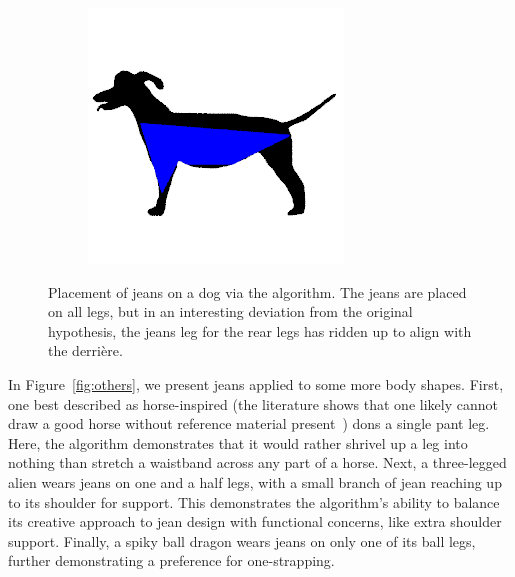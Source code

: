 \documentclass[twocolumn]{article}
\begin{document}
\begin{figure}
\begin{subfigure}{0.23\textwidth}
        \includegraphics[width=0.92\linewidth]{img/dog/iter_99.png}
    \end{subfigure}
    \caption{Placement of jeans on a dog via the algorithm. The jeans are placed on all legs, but in an interesting deviation from the original hypothesis, the jeans leg for the rear legs has ridden up to align with the derri\`ere.}
    \label{fig:dog}
\end{figure}

In Figure~\ref{fig:others}, we present jeans applied to some more body shapes. First, one best described as horse-inspired (the literature shows that one likely cannot draw a good horse without reference material present~\cite{pagurek_2022}) dons a single pant leg. Here, the algorithm demonstrates that it would rather shrivel up a leg into nothing than stretch a waistband across any part of a horse. Next, a three-legged alien wears jeans on one and a half legs, with a small branch of jean reaching up to its shoulder for support. This demonstrates the algorithm's ability to balance its creative approach to jean design with functional concerns, like extra shoulder support. Finally, a spiky ball dragon wears jeans on only one of its ball legs, further demonstrating a preference for one-strapping.
\end{document}
